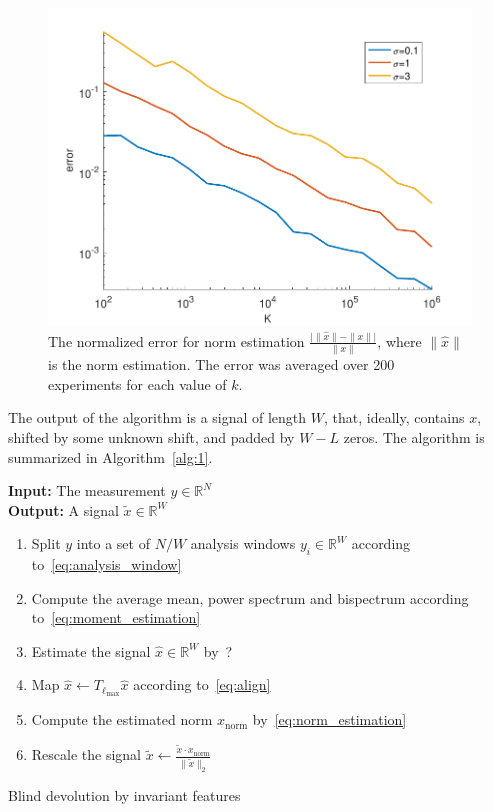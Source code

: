 \documentclass[journal]{IEEEtran}
\numberwithin{equation}{section}
\numberwithin{figure}{section}
\theoremstyle{plain}
\theoremstyle{definition}
\theoremstyle{remark}
\theoremstyle{plain}
\theoremstyle{remark}
\theoremstyle{plain}
\theoremstyle{plain}
\newcommand{\RN}{\mathbb{R}^N}
\begin{document}
\begin{figure}
	\begin{center}
		\includegraphics[scale = .5]{NormError}		
	\end{center}
	\caption{The normalized error for norm estimation $\frac{\vert \|\hat{x}\|  - \|x\|\vert }{\|x\|}$, where $\|\hat{x}\|$ is the norm estimation. The error was averaged over 200 experiments for each value of $k$.}
	\label{fig:norn_error}
\end{figure}

The output of the algorithm is a signal of length $W$, that, ideally, contains $x$, shifted by some unknown shift, and padded by $W-L$ zeros. 
The algorithm is summarized in Algorithm~\ref{alg:1}.


\begin{algorithm}[h]
		\textbf{Input:} The measurement $y\in\RN$ \\ 
		\textbf{Output:} A signal $\tilde x\in\mathbb{R}^W$  \\ 
		\begin{enumerate}
			\item Split $y$ into a set of $N/W$ analysis windows $y_i\in\mathbb{R}^W$ according to~\eqref{eq:analysis_window}
			\item  Compute the average mean, power spectrum and bispectrum according to~\eqref{eq:moment_estimation} 
			\item  Estimate the signal $\hat{x}\in\mathbb{R}^W$ by~?
			\item  Map $\hat{x}\gets T_{\ell_{\max}}\hat{x}$ according to~\eqref{eq:align}
			\item  Compute the estimated norm $x_{\textrm{norm}}$  by~\eqref{eq:norm_estimation}
			\item  Rescale the signal $\tilde x \gets \frac{\tilde{x}\cdot x_{\textrm{norm}}}{\|\tilde{x}\|_2} $   
		\end{enumerate}
	\caption{Blind devolution by invariant features} 	\label{alg:1}
\end{algorithm}
\end{document}
